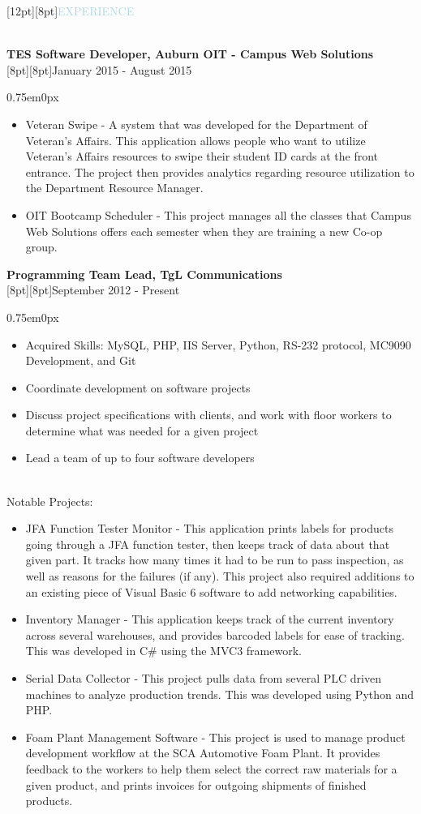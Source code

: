 \documentclass{res}
\newenvironment{ResumeBlock}[1]
{
	\begin{normalsize}
		\raisebox{0pt}[12pt][8pt]{\textcolor{lightblue}{#1}}
	\end{normalsize}
	\\
}
{	
}
\newenvironment{DetailsBlock}[2]
{
	\textbf{\color{darkfont}#1}
	\\
	\raisebox{0pt}[8pt][8pt]{#2}
	\begin{adjustwidth}{0.75em}{0px}
}
{	
	\end{adjustwidth}
}
\begin{document}
\begin{ResumeBlock}{EXPERIENCE}
\begin{DetailsBlock}{TES Software Developer, Auburn OIT - Campus Web Solutions}{January 2015 - August 2015}
\begin{itemize}
				\item Veteran Swipe - A system that was developed for the Department of Veteran's Affairs.  This application allows people who want to utilize Veteran's Affairs resources to swipe their student ID cards at the front entrance.  The project then provides analytics regarding resource utilization to the Department Resource Manager.
				\item OIT Bootcamp Scheduler - This project manages all the classes that Campus Web Solutions offers each semester when they are training a new Co-op group. 
			\end{itemize}
		\end{DetailsBlock}		
		\begin{DetailsBlock}{Programming Team Lead, TgL Communications}{September 2012 - Present}
			\begin{itemize}
				\item Acquired Skills:  MySQL, PHP, IIS Server, Python, RS-232 protocol, MC9090 Development, and Git 
				\item Coordinate development on software projects 
				\item Discuss project specifications with clients, and work with floor workers to determine what was needed for a given project 
				\item Lead a team of up to four software developers 
			\end{itemize}
			~\\
			Notable Projects:
			\begin{itemize}
				\item JFA Function Tester Monitor - This application prints labels for products going through a JFA function tester, then keeps track of data about that given part.  It tracks how many times it had to be run to pass inspection, as well as reasons for the failures (if any).  This project also required additions to an existing piece of Visual Basic 6 software to add networking capabilities.
				\item Inventory Manager - This application keeps track of the current inventory across several warehouses, and provides barcoded labels for ease of tracking.  This was developed in C\# using the MVC3 framework. 
				\item Serial Data Collector - This project pulls data from several PLC driven machines to analyze production trends.  This was developed using Python and PHP. 
				\item Foam Plant Management Software - This project is used to manage product development workflow at the SCA Automotive Foam Plant.  It provides feedback to the workers to help them select the correct raw materials for a given product, and prints invoices for outgoing shipments of finished products.   

\end{itemize}
\end{DetailsBlock}
\end{ResumeBlock}
\end{document}
